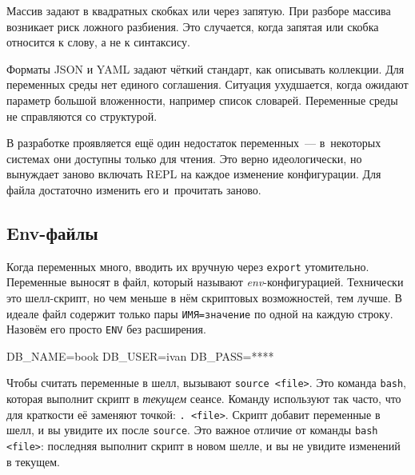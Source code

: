 \fi


Массив задают в квадратных скобках или через запятую. При разборе массива
возникает риск ложного разбиения. Это случается, когда запятая или скобка
относится к слову, а не к синтаксису.


Форматы JSON и YAML задают чёткий стандарт, как описывать коллекции. Для
переменных среды нет единого соглашения. Ситуация ухудшается, когда ожидают
параметр большой вложенности, например список словарей. Переменные среды не
справляются со структурой.

В разработке проявляется ещё один недостаток переменных~--- в~некоторых системах
они доступны только для чтения. Это верно идеологически, но вынуждает заново
включать REPL на каждое изменение конфигурации. Для файла достаточно изменить
его и~прочитать заново.

\subsection{Env-файлы}


Когда переменных много, вводить их вручную через \verb|export|
утомительно. Переменные выносят в файл, который называют
\emph{env}-кон\-фи\-гу\-ра\-цией. Технически это шелл-скрипт, но чем меньше в
нём скриптовых возможностей, тем лучше. В идеале файл содержит только пары
\verb|ИМЯ=значение| по одной на каждую строку. Назовём его просто \verb|ENV| без
расширения.

\begin{english}
  \begin{bash}
DB_NAME=book
DB_USER=ivan
DB_PASS=****
  \end{bash}
\end{english}

Чтобы считать переменные в шелл, вызывают \verb|source <file>|. Это команда
\verb|bash|, которая выполнит скрипт в \emph{текущем} сеансе. Команду используют
так часто, что для краткости её заменяют точкой: \verb|. <file>|. Скрипт добавит
переменные в шелл, и вы увидите их после \verb|source|. Это важное отличие от
команды \verb|bash <file>|: последняя выполнит скрипт в новом шелле, и вы не
увидите изменений в текущем.

\begin{english}
\end{english}

